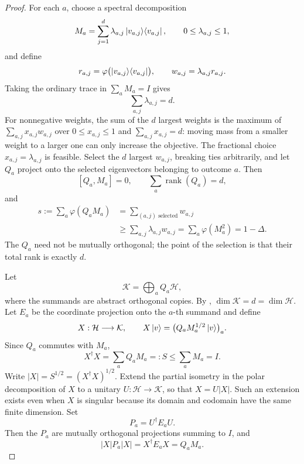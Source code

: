 \documentclass[11pt]{article}
\theoremstyle{definition}
\newcommand{\calH}{\mathcal{H}}
\newcommand{\abs}[1]{\lvert #1 \rvert}
\begin{document}
\begin{proof}
For each $a$, choose a spectral decomposition
\begin{equation*}
 M_a=\sum_{j=1}^d\lambda_{a,j}
       \ket{v_{a,j}}\!\bra{v_{a,j}},
 \qquad 0\leq\lambda_{a,j}\leq1,
\end{equation*}
and define
\begin{equation*}
 r_{a,j}=\varphi\bigl(\ket{v_{a,j}}\!\bra{v_{a,j}}\bigr),
 \qquad w_{a,j}=\lambda_{a,j}r_{a,j}.
\end{equation*}
Taking the ordinary trace in $\sum_aM_a=I$ gives
\begin{equation*}
 \sum_{a,j}\lambda_{a,j}=d.
\end{equation*}
For nonnegative weights, the sum of the $d$ largest weights is the
maximum of $\sum_{a,j}x_{a,j}w_{a,j}$ over
$0\leq x_{a,j}\leq1$ and $\sum_{a,j}x_{a,j}=d$: moving mass from a
smaller weight to a larger one can only increase the objective.
The fractional choice $x_{a,j}=\lambda_{a,j}$ is feasible.  Select the
$d$ largest $w_{a,j}$, breaking ties arbitrarily, and let $Q_a$ project
onto the selected eigenvectors belonging to outcome $a$.  Then
\begin{equation}\label{eq:global-rank-allocation}
 [Q_a,M_a]=0,
 \qquad \sum_a\operatorname{rank}(Q_a)=d,
\end{equation}
and
\begin{align}
 s:=\sum_a\varphi(Q_aM_a)
 &=\sum_{(a,j)\text{ selected}}w_{a,j}\nonumber\\
 &\geq\sum_{a,j}\lambda_{a,j}w_{a,j}
 =\sum_a\varphi(M_a^2)
 =1-\Delta.\label{eq:selected-overlap}
\end{align}
The $Q_a$ need not be mutually orthogonal; the point of the selection
is that their total rank is exactly $d$.

Let
\begin{equation*}
 \mathcal K=\bigoplus_a Q_a\calH,
\end{equation*}
where the summands are abstract orthogonal copies.  By
, $\dim\mathcal K=d=\dim\calH$.  Let
$E_a$ be the coordinate projection onto the $a$-th summand and define
\begin{equation*}
 X:\calH\longrightarrow\mathcal K,
 \qquad
 X\ket v=\bigl(Q_aM_a^{1/2}\ket v\bigr)_a.
\end{equation*}
Since $Q_a$ commutes with $M_a$,
\begin{equation*}
 X^\dagger X=\sum_aQ_aM_a=:S\leq\sum_aM_a=I.
\end{equation*}
Write $\abs{X}=S^{1/2}=(X^\dagger X)^{1/2}$.  Extend the partial isometry in the polar
decomposition of $X$ to a unitary $U:\calH\to\mathcal K$, so that
$X=U\abs{X}$.  Such an extension exists even when $X$ is singular because
its domain and codomain have the same finite dimension.  Set
\begin{equation*}
 P_a=U^\dagger E_aU.
\end{equation*}
Then the $P_a$ are mutually orthogonal projections summing to $I$, and
\begin{equation}\label{eq:polar-coordinate-identity}
 \abs{X}P_a\abs{X}=X^\dagger E_aX=Q_aM_a.
\end{equation}


\end{proof}
\end{document}
